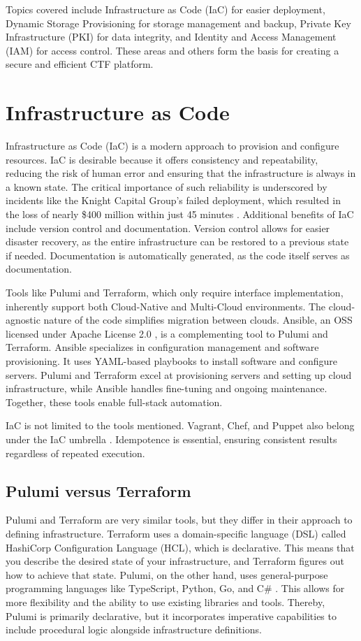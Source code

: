 Topics covered include Infrastructure as Code (IaC) for easier deployment, Dynamic Storage Provisioning for storage management and backup, Private Key Infrastructure (PKI) for data integrity, and Identity and Access Management (IAM) for access control. These areas and others form the basis for creating a secure and efficient CTF platform.

\section{Infrastructure as Code}

Infrastructure as Code (IaC) is a modern approach to provision and configure resources. IaC is desirable because it offers consistency and repeatability, reducing the risk of human error and ensuring that the infrastructure is always in a known state. The critical importance of such reliability is underscored by incidents like the Knight Capital Group's failed deployment, which resulted in the loss of nearly \$400 million within just 45 minutes \Parencite{seven2014knightmare}. Additional benefits of IaC include version control and documentation. Version control allows for easier disaster recovery, as the entire infrastructure can be restored to a previous state if needed. Documentation is automatically generated, as the code itself serves as documentation. 

Tools like Pulumi and Terraform, which only require interface implementation, inherently support both Cloud-Native and Multi-Cloud environments. The cloud-agnostic nature of the code simplifies migration between clouds. Ansible, an OSS licensed under Apache License 2.0 \Parencite{ansible_license}, is a complementing tool to Pulumi and Terraform. Ansible specializes in configuration management and software provisioning. It uses YAML-based playbooks to install software and configure servers. Pulumi and Terraform excel at provisioning servers and setting up cloud infrastructure, while Ansible handles fine-tuning and ongoing maintenance. Together, these tools enable full-stack automation.

IaC is not limited to the tools mentioned. Vagrant, Chef, and Puppet also belong under the IaC umbrella \Parencite{spacelift_iac_tools}. Idempotence is essential, ensuring consistent results regardless of repeated execution.

\subsection{Pulumi versus Terraform}
Pulumi and Terraform are very similar tools, but they differ in their approach to defining infrastructure. Terraform uses a domain-specific language (DSL) called HashiCorp Configuration Language (HCL), which is declarative. This means that you describe the desired state of your infrastructure, and Terraform figures out how to achieve that state. Pulumi, on the other hand, uses general-purpose programming languages like TypeScript, Python, Go, and C\# \Parencite{pulumi_vs_terraform}. This allows for more flexibility and the ability to use existing libraries and tools. Thereby, Pulumi is primarily declarative, but it incorporates imperative capabilities to include procedural logic alongside infrastructure definitions.

